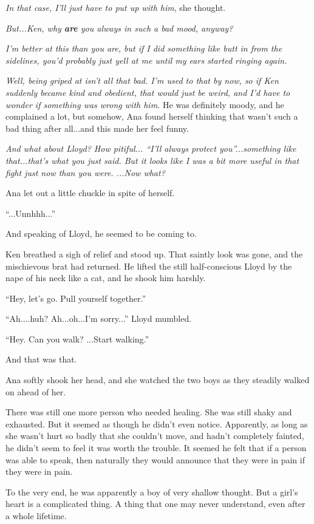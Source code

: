 \documentclass[
]{article}
\begin{document}
\emph{In that case, I'll just have to put up with him}, she thought.

\emph{But...Ken, why \textbf{are} you always in such a bad mood,
anyway?}

\emph{I'm better at this than you are, but if I did something like butt
in from the sidelines, you'd probably just yell at me until my ears
started ringing again.}

\emph{Well, being griped at isn't all that bad. I'm used to that by now,
so if Ken suddenly became kind and obedient, that would just be weird,
and I'd have to wonder if something was wrong with him.} He was
definitely moody, and he complained a lot, but somehow, Ana found
herself thinking that wasn't such a bad thing after all...and this made
her feel funny.

\emph{And what about Lloyd? How pitiful... ``I'll always protect
you''...something like that...that's what you just said. But it looks
like I was a bit more useful in that fight just now than you were.
...Now what?}

Ana let out a little chuckle in spite of herself.

``...Unnhhh...''

And speaking of Lloyd, he seemed to be coming to.

Ken breathed a sigh of relief and stood up. That saintly look was gone,
and the mischievous brat had returned. He lifted the still
half-conscious Lloyd by the nape of his neck like a cat, and he shook
him harshly.

``Hey, let's go. Pull yourself together.''

``Ah....huh? Ah...oh...I'm sorry...'' Lloyd mumbled.

``Hey. Can you walk? ...Start walking.''

And that was that.

Ana softly shook her head, and she watched the two boys as they steadily
walked on ahead of her.

There was still one more person who needed healing. She was still shaky
and exhausted. But it seemed as though he didn't even notice.
Apparently, as long as she wasn't hurt so badly that she couldn't move,
and hadn't completely fainted, he didn't seem to feel it was worth the
trouble. It seemed he felt that if a person was able to speak, then
naturally they would announce that they were in pain if they were in
pain.

To the very end, he was apparently a boy of very shallow thought. But a
girl's heart is a complicated thing. A thing that one may never
understand, even after a whole lifetime.
\end{document}
